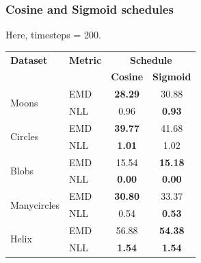 \documentclass[11pt]{article}
\begin{document}
\subsubsection{Cosine and Sigmoid schedules}
Here, timesteps = 200.
\begin{longtable}{|l|l|c|c|}
    \hline
     \textbf{Dataset} & \textbf{Metric} & \multicolumn{2}{c|}{\textbf{Schedule}} \\
     \cline{3-4}
     & & \textbf{Cosine} & \textbf{Sigmoid} \\
    \hline
        \multirow{2}{*}{Moons} & EMD & \textbf{28.29} & 30.88 \\
        \cline{2-4}
        & NLL & 0.96 & \textbf{0.93} \\
        \hline
        \multirow{2}{*}{Circles} & EMD & \textbf{39.77} & 41.68 \\
        \cline{2-4}
        & NLL & \textbf{1.01} & 1.02 \\
        \hline
        \multirow{2}{*}{Blobs} & EMD & 15.54 & \textbf{15.18} \\
        \cline{2-4}
        & NLL & \textbf{0.00} & \textbf{0.00} \\
        \hline
        \multirow{2}{*}{Manycircles} & EMD & \textbf{30.80} & 33.37 \\
        \cline{2-4}
        & NLL & 0.54 & \textbf{0.53} \\
        \hline
        \multirow{2}{*}{Helix} & EMD & 56.88 & \textbf{54.38} \\
        \cline{2-4}
        & NLL & \textbf{1.54} & \textbf{1.54} \\
        \hline
\end{longtable}
\end{document}
